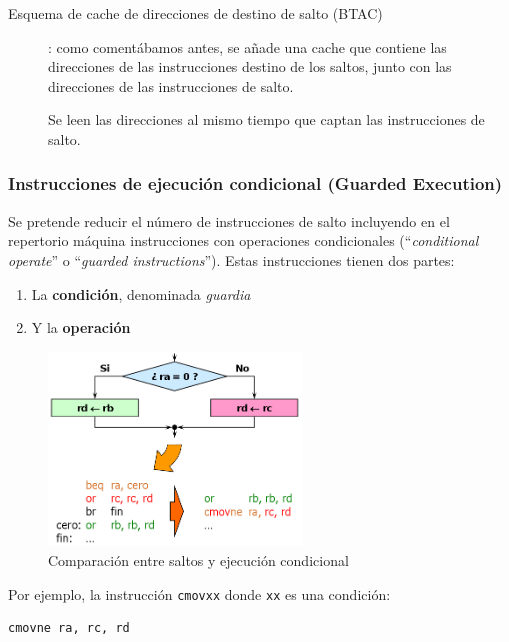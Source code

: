 \documentclass[10pt,a4paper,spanish]{report}
\begin{document}
\begin{description}
    \item[Esquema de cache de direcciones de destino de salto (BTAC)]: como comentábamos antes, se añade una cache que contiene las direcciones de las instrucciones destino de los saltos, junto con las direcciones de las instrucciones de salto.

    Se leen las direcciones al mismo tiempo que captan las instrucciones de salto. 
\end{description}

\textcolor{azul}{\subsubsection{Instrucciones de ejecución condicional (Guarded Execution)}}
Se pretende reducir el número de instrucciones de salto incluyendo en el repertorio máquina instrucciones con operaciones condicionales (``\textit{\textcolor{azul}{conditional operate}}'' o ``\textit{\textcolor{azul}{guarded instructions}}''). Estas instrucciones tienen dos partes:
\begin{enumerate}[\color{azul}{$\heartsuit$}]
    \item La \textbf{\textcolor{azul}{condición}}, denominada \textit{\textcolor{azul}{guardia}}
    \item Y la \textbf{\textcolor{azul}{operación}}
\end{enumerate}

\begin{figure}[!h]
\centering
\includegraphics[width=0.6\textwidth]{108}
\caption{Comparación entre saltos y ejecución condicional}
\label{ejemplo_cmove}
\end{figure}

Por ejemplo, la instrucción \verb*|cmovxx| donde \verb*|xx| es una condición:

\begin{verbatim}
cmovne ra, rc, rd
\end{verbatim}
\end{document}
